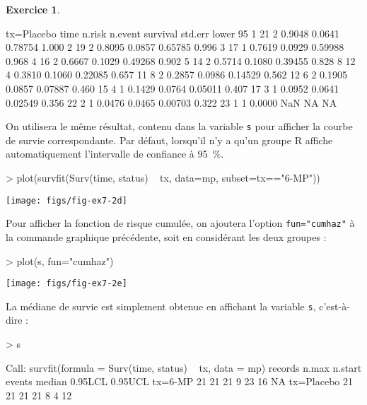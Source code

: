 \documentclass[11pt]{report}
\theoremstyle{definition}
\newtheorem{exo}{Exercice}[chapter]
\newcommand{\R}{\textsf{R}\xspace}
\begin{document}
\begin{exo}
\begin{sol}
\begin{Schunk}
\begin{Soutput}
                tx=Placebo 
 time n.risk n.event survival std.err lower 95% CI upper 95% CI
    1     21       2   0.9048  0.0641      0.78754        1.000
    2     19       2   0.8095  0.0857      0.65785        0.996
    3     17       1   0.7619  0.0929      0.59988        0.968
    4     16       2   0.6667  0.1029      0.49268        0.902
    5     14       2   0.5714  0.1080      0.39455        0.828
    8     12       4   0.3810  0.1060      0.22085        0.657
   11      8       2   0.2857  0.0986      0.14529        0.562
   12      6       2   0.1905  0.0857      0.07887        0.460
   15      4       1   0.1429  0.0764      0.05011        0.407
   17      3       1   0.0952  0.0641      0.02549        0.356
   22      2       1   0.0476  0.0465      0.00703        0.322
   23      1       1   0.0000     NaN           NA           NA
\end{Soutput}
\end{Schunk}
On utilisera le même résultat, contenu dans la variable \texttt{s} pour
afficher la courbe de survie correspondante. Par défaut, lorsqu'il n'y a
qu'un groupe \R affiche automatiquement l'intervalle de confiance à 95~\%.
\begin{Schunk}
\begin{Sinput}
> plot(survfit(Surv(time, status) ~ tx, data=mp, subset=tx=="6-MP"))
\end{Sinput}
\end{Schunk}
\texttt{[image: figs/fig-ex7-2d]}

Pour afficher la fonction de risque cumulée, on ajoutera l'option
\verb|fun="cumhaz"| à la commande graphique précédente, soit en considérant
les deux groupes :
\begin{Schunk}
\begin{Sinput}
> plot(s, fun="cumhaz")
\end{Sinput}
\end{Schunk}
\texttt{[image: figs/fig-ex7-2e]}

La médiane de survie est simplement obtenue en affichant la variable
\texttt{s}, c'est-à-dire :
\begin{Schunk}
\begin{Sinput}
> s
\end{Sinput}
\begin{Soutput}
Call: survfit(formula = Surv(time, status) ~ tx, data = mp)
           records n.max n.start events median 0.95LCL 0.95UCL
tx=6-MP         21    21      21      9     23      16      NA
tx=Placebo      21    21      21     21      8       4      12
\end{Soutput}
\end{Schunk}
\end{sol}
\end{exo}
\end{document}
